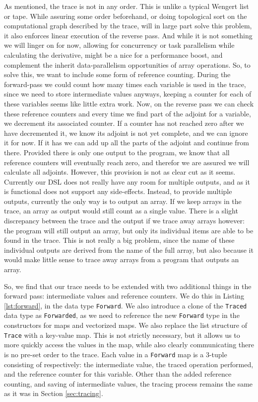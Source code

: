    As mentioned, the trace is not in any order.
    This is unlike a typical Wengert list or tape.
    While assuring some order beforehand, or doing topological sort on the computational graph described by the trace, will in large part solve this problem, it also enforces linear execution of the reverse pass.
    And while it is not something we will linger on for now, allowing for concurrency or task parallelism while calculating the derivative, might be a nice for a performance boost, and complement the inherit data-parallelism opportunities of array operations.
    So, to solve this, we want to include some form of reference counting.
    During the forward-pass we could count how many times each variable is used in the trace, since we need to store intermediate values anyways, keeping a counter for each of these variables seems like little extra work.
    Now, on the reverse pass we can check these reference counters and every time we find part of the adjoint for a variable, we decrement its associated counter.
    If a counter has not reached zero after we have decremented it, we know its adjoint is not yet complete, and we can ignore it for now.
    If it has we can add up all the parts of the adjoint and continue from there.
    Provided there is only one output to the program, we know that all reference counters will eventually reach zero, and therefor we are assured we will calculate all adjoints.
    However, this provision is not as clear cut as it seems.
    Currently our DSL does not really have any room for multiple outputs, and as it is functional does not support any side-effects.
    Instead, to provide multiple outputs, currently the only way is to output an array.
    If we keep arrays in the trace, an array as output would still count as a single value.
    There is a slight discrepancy between the trace and the output if we trace away arrays however: the program will still output an array, but only its individual items are able to be found in the trace.
    This is not really a big problem, since the name of these individual outputs are derived from the name of the full array, but also because it would make little sense to trace away arrays from a program that outputs an array.

    So, we find that our trace needs to be extended with two additional things in the forward pass: intermediate values and reference counters.
    We do this in Listing \ref{lst:forward}, in the data type \texttt{Forward}.
    We also introduce a clone of the \texttt{Traced} data type as \texttt{Forwarded}, as we need to reference the new \texttt{Forward} type in the constructors for maps and vectorized maps.
    We also replace the list structure of \texttt{Trace} with a key-value map.
    This is not strictly necessary, but it allows us to more quickly access the values in the map, while also clearly communicating there is no pre-set order to the trace.
    Each value in a \texttt{Forward} map is a 3-tuple consisting of respectively: the intermediate value, the traced operation performed, and the reference counter for this variable.
    Other than the added reference counting, and saving of intermediate values, the tracing process remains the same as it was in Section \ref{sec:tracing}.

